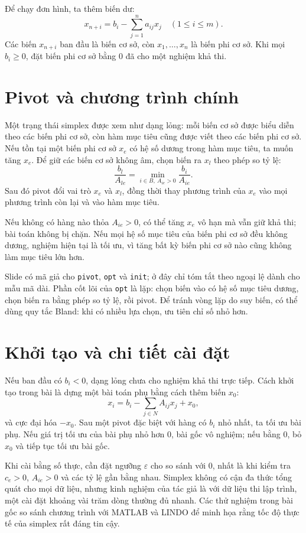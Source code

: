 \documentclass[11pt]{article}
\begin{document}
Để chạy đơn hình, ta thêm biến dư:
\[
  x_{n+i}=b_i-\sum_{j=1}^{n} a_{ij}x_j \quad (1\le i\le m).
\]
Các biến \(x_{n+i}\) ban đầu là biến cơ sở, còn \(x_1,\ldots,x_n\) là biến
phi cơ sở. Khi mọi \(b_i\ge 0\), đặt biến phi cơ sở bằng \(0\) đã cho một
nghiệm khả thi.

\section{Pivot và chương trình chính}

Một trạng thái simplex được xem như dạng lỏng: mỗi biến cơ sở được biểu diễn
theo các biến phi cơ sở, còn hàm mục tiêu cũng được viết theo các biến phi cơ
sở. Nếu tồn tại một biến phi cơ sở \(x_e\) có hệ số dương trong hàm mục tiêu,
ta muốn tăng \(x_e\). Để giữ các biến cơ sở không âm, chọn biến ra \(x_l\)
theo phép so tỷ lệ:
\[
  \frac{b_l}{A_{le}}=
  \min_{i\in B,\ A_{ie}>0}\frac{b_i}{A_{ie}}.
\]
Sau đó pivot đổi vai trò \(x_e\) và \(x_l\), đồng thời thay phương trình của
\(x_e\) vào mọi phương trình còn lại và vào hàm mục tiêu.

Nếu không có hàng nào thỏa \(A_{ie}>0\), có thể tăng \(x_e\) vô hạn mà vẫn
giữ khả thi; bài toán không bị chặn. Nếu mọi hệ số mục tiêu của biến phi cơ
sở đều không dương, nghiệm hiện tại là tối ưu, vì tăng bất kỳ biến phi cơ sở
nào cũng không làm mục tiêu lớn hơn.

Slide có mã giả cho \texttt{pivot}, \texttt{opt} và \texttt{init}; ở đây chỉ
tóm tắt theo ngoại lệ dành cho mẫu mã dài. Phần cốt lõi của \texttt{opt} là
lặp: chọn biến vào có hệ số mục tiêu dương, chọn biến ra bằng phép so tỷ lệ,
rồi pivot. Để tránh vòng lặp do suy biến, có thể dùng quy tắc Bland: khi có
nhiều lựa chọn, ưu tiên chỉ số nhỏ hơn.

\section{Khởi tạo và chi tiết cài đặt}

Nếu ban đầu có \(b_i<0\), dạng lỏng chưa cho nghiệm khả thi trực tiếp. Cách
khởi tạo trong bài là dựng một bài toán phụ bằng cách thêm biến \(x_0\):
\[
  x_i=b_i-\sum_{j\in N} A_{ij}x_j+x_0,
\]
và cực đại hóa \(-x_0\). Sau một pivot đặc biệt với hàng có \(b_i\) nhỏ nhất,
ta tối ưu bài phụ. Nếu giá trị tối ưu của bài phụ nhỏ hơn \(0\), bài gốc vô
nghiệm; nếu bằng \(0\), bỏ \(x_0\) và tiếp tục tối ưu bài gốc.

Khi cài bằng số thực, cần đặt ngưỡng \(\varepsilon\) cho so sánh với \(0\),
nhất là khi kiểm tra \(c_e>0\), \(A_{ie}>0\) và các tỷ lệ gần bằng nhau.
Simplex không có cận đa thức tổng quát cho mọi dữ liệu, nhưng kinh nghiệm của
tác giả là với dữ liệu thi lập trình, một cài đặt khoảng vài trăm dòng thường
đủ nhanh. Các thử nghiệm trong bài gốc so sánh chương trình với MATLAB và
LINDO để minh họa rằng tốc độ thực tế của simplex rất đáng tin cậy.
\end{document}
